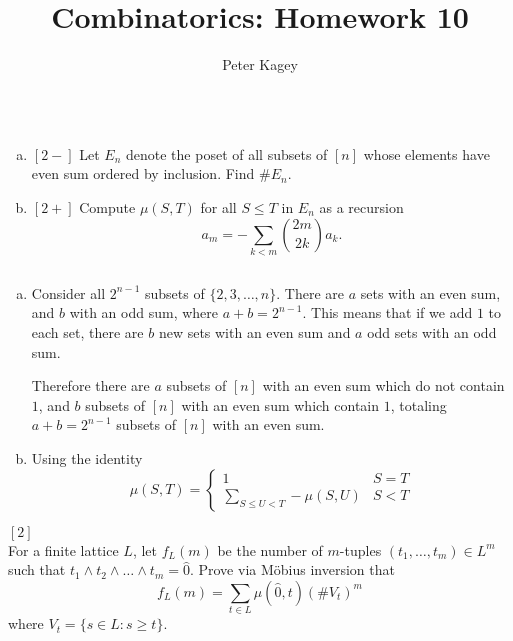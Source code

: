 \documentclass{article}
\newenvironment{problem}[2][Problem]{\begin{trivlist}
\item[\hskip \labelsep {\bfseries #1}\hskip \labelsep {\bfseries #2.}]}{\end{trivlist}}
\newenvironment{solution}[1][Solution.]{\begin{trivlist}
\item[\hskip \labelsep {\bfseries #1}]}{\end{trivlist}}
\newcommand{\set}[1]{\{ #1 \}}
\begin{document}
\title{Combinatorics: Homework 10}
\author{Peter Kagey}

\maketitle

\begin{problem}{70} $ $
  \begin{enumerate}[a.]
    \item $[2-]$ Let $E_n$ denote the poset of all subsets of $[n]$ whose
    elements have even sum ordered by inclusion. Find $\#E_n$.
    \item $[2+]$ Compute $\mu(S, T)$ for all $S \leq T$ in $E_n$ as a recursion \[
      a_m = -\sum_{k<m}\binom{2m}{2k}a_k.
    \]
  \end{enumerate}
\end{problem}

\begin{solution} $ $
  \begin{enumerate}[a.]
    \item Consider all $2^{n-1}$ subsets of $\set{2,3,\hdots,n}$.
    There are $a$ sets with an even sum, and $b$ with an odd sum, where
    $a + b = 2^{n-1}$. This means that if we add $1$ to each set, there are
    $b$ new sets with an even sum and $a$ odd sets with an odd sum.

    Therefore there are
    $a$ subsets of $[n]$ with an even sum which do not contain $1$, and
    $b$ subsets of $[n]$ with an even sum which contain $1$, totaling
    $a+b = 2^{n-1}$ subsets of $[n]$ with an even sum.
    \item Using the identity \[
      \mu(S, T) = \begin{cases}
        1 & S = T \\
        \displaystyle\sum_{S \leq U < T} -\mu(S,U) & S < T
      \end{cases}
    \]
  \end{enumerate}
\end{solution}
\pagebreak
\begin{problem}{89} $[2]$ \\
  For a finite lattice $L$, let $f_L(m)$ be the number of $m$-tuples
  $(t_1, \hdots, t_m) \in L^m$ such that
  $t_1 \wedge t_2 \wedge \hdots \wedge t_m = \hat 0$. Prove via M\"obius
  inversion that \[
    f_L(m) = \sum_{t \in L} \mu(\hat 0, t)(\#V_t)^m
  \] where $V_t = \set{s \in L : s \geq t}$.
\end{problem}
\end{document}
